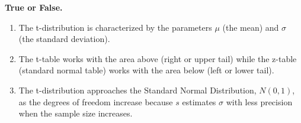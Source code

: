 \item \textbf{True or False.}
\begin{enumerate}
\item The t-distribution is characterized by the parameters $\mu$ (the mean) and $\sigma$ (the standard deviation). 
\item The t-table works with the area above (right or upper tail) while the z-table (standard normal table) works with the area below (left or lower tail).
\item The t-distribution approaches the Standard Normal Distribution, $N(0,1)$, as the degrees of freedom increase because $s$ estimates $\sigma$ with less precision when the sample size increases. 
\end{enumerate}


